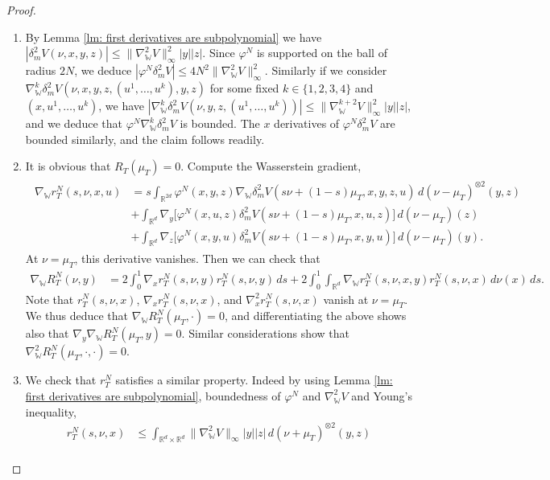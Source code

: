 \documentclass[11pt,reqno]{amsart}
\numberwithin{equation}{section}
\theoremstyle{definition}
\def\R{{\mathbb R}}
\newcommand{\wgrad}{\nabla_{\W}}
\newcommand{\W}{\mathbb W}
\begin{document}
 \begin{proof} { \ } 
\begin{enumerate}
    \item By Lemma \ref{lm: first derivatives are subpolynomial} we have $|\delta_m^2 V(\nu,x,y,z)|\le \|\wgrad^2 V\|_\infty^2|y||z|$. Since $\varphi^N$ is supported on the ball of radius $2N$, we deduce $|\varphi^N\delta_m^2 V| \le 4N^2 \|\wgrad^2 V\|_\infty^2$. Similarly if we consider $\wgrad^k \delta_m^2 V(\nu,x,y,z,(u^1,\ldots,u^k),y,z)$ for some fixed $k\in\{1,2,3,4\}$ and $(x,u^1,\ldots,u^k)$, we have $|\wgrad^k \delta_m^2 V(\nu,y,z,(u^1,\dots,u^k))|\le \|\wgrad^{k+2} V\|_\infty^2|y||z|$, and we deduce that $\varphi^N\wgrad^k \delta_m^2 V$ is bounded. The $x$ derivatives of $\varphi^N\delta_m^2V$ are bounded similarly, and the claim follows readily.
    \item It is obvious that $R_T(\mu_T)=0$. Compute the Wasserstein gradient,
    \begin{align}
    \label{eq: wgrad rN}
    \begin{split}
        \wgrad r_T^N(s,\nu,x,u)&=s\int_{\R^{2d}}\varphi^N (x,y,z)\wgrad \delta_m^2  V(s\nu+(1-s)\mu_T,x,y,z,u)\,d(\nu-\mu_T)^{\otimes 2}(y,z)\\
        &+\int_{\R^d}\nabla_{y}\big[\varphi^N (x,u,z) \delta_m^2  V(s\nu+(1-s)\mu_T,x,u,z)\big]\,d(\nu-\mu_T)(z)\\
        &+\int_{\R^d}\nabla_{z}\big[\varphi^N (x,y,u)\delta_m^2  V(s\nu+(1-s)\mu_T,x,y,u)\big]\,d(\nu-\mu_T)(y).
    \end{split}
    \end{align}
    At $\nu=\mu_T$, this derivative vanishes.  Then we can check that
\begin{align*}
     \wgrad R_T^N(\nu,y)&=2\int_0^1 \nabla_x r_T^N(s,\nu,y) r^N_T(s,\nu,y)\,ds+2\int_0^1\int_{\R^d}\wgrad r_T^N(s,\nu,x,y)r_T^N(s,\nu,x)\,d\nu(x)\,ds.
 \end{align*}
 Note that $r_T^N(s,\nu,x)$, $\nabla_x r_T^N(s,\nu,x)$, and $\nabla_x^2 r_T^N(s,\nu,x)$ vanish at $\nu=\mu_T$. We thus deduce that $\wgrad R_T^N(\mu_T,\cdot)=0$, and differentiating the above shows also that $\nabla_y \wgrad R_T^N(\mu_T,y)=0$. Similar considerations show that $\wgrad^2 R_T^N(\mu_T,\cdot,\cdot) = 0$.
 \item We check that $r_T^N$ satisfies a similar property. Indeed by using Lemma \ref{lm: first derivatives are subpolynomial}, boundedness of $\varphi^N$ and $\wgrad^2  V$ and Young's inequality,
 \begin{align*}
 r_T^N(s,\nu,x)&\leq \int_{\R^d\times \R^d} \|\wgrad^2  V\|_\infty |y||z|\,d(\nu+\mu_T)^{\otimes2}(y,z)\\

\end{align*}
\end{enumerate}
\end{proof}
\end{document}
